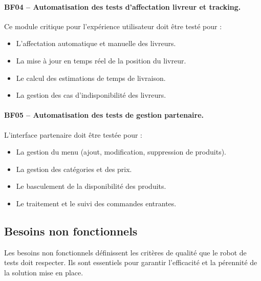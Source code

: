 \paragraph{BF04 -- Automatisation des tests d'affectation livreur et tracking.}
Ce module critique pour l'expérience utilisateur doit être testé pour :
\begin{itemize}[nosep]
    \item L'affectation automatique et manuelle des livreurs.
    \item La mise à jour en temps réel de la position du livreur.
    \item Le calcul des estimations de temps de livraison.
    \item La gestion des cas d'indisponibilité des livreurs.
\end{itemize}

\paragraph{BF05 -- Automatisation des tests de gestion partenaire.}
L'interface partenaire doit être testée pour :
\begin{itemize}[nosep]
    \item La gestion du menu (ajout, modification, suppression de produits).
    \item La gestion des catégories et des prix.
    \item Le basculement de la disponibilité des produits.
    \item Le traitement et le suivi des commandes entrantes.
\end{itemize}

\subsection{Besoins non fonctionnels}
\label{subsec:besoins-non-fonctionnels}

Les besoins non fonctionnels définissent les critères de qualité que le robot de tests doit respecter. Ils sont essentiels pour garantir l'efficacité et la pérennité de la solution mise en place.


